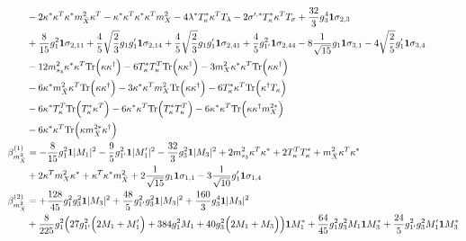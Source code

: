 {\begin{align}
 &-2 {\kappa^*  \kappa^{T}  \kappa^*  m_{\bar{X}}^2  \kappa^{T}} - {\kappa^*  \kappa^{T}  \kappa^*  \kappa^{T}  m_{X}^2} -4 \lambda^* {T_{\kappa}^*  \kappa^{T}} T_{\lambda} -2 \sigma^{\prime,*} {T_{\kappa}^*  \kappa^{T}} T_{\sigma} +\frac{32}{3} g_{3}^{4} {\bf 1} \sigma_{2,3} \nonumber \\ 
 &+\frac{8}{15} g_{1}^{2} {\bf 1} \sigma_{2,11} +\frac{4}{5} \sqrt{\frac{2}{3}} g_1 g_1' {\bf 1} \sigma_{2,14} +\frac{4}{5} \sqrt{\frac{2}{3}} g_1 g_1' {\bf 1} \sigma_{2,41} +\frac{4}{5} g_{1'}^{2} {\bf 1} \sigma_{2,44} -8 \frac{1}{\sqrt{15}} g_1 {\bf 1} \sigma_{3,1} -4 \sqrt{\frac{2}{5}} g_1' {\bf 1} \sigma_{3,4} \nonumber \\ 
 &-12 m_{s_3}^2 {\kappa^*  \kappa^{T}} \mbox{Tr}\Big({\kappa  \kappa^{\dagger}}\Big) -6 {T_{\kappa}^*  T_{\kappa}^{T}} \mbox{Tr}\Big({\kappa  \kappa^{\dagger}}\Big) -3 {m_{X}^2  \kappa^*  \kappa^{T}} \mbox{Tr}\Big({\kappa  \kappa^{\dagger}}\Big) \nonumber \\ 
 &-6 {\kappa^*  m_{\bar{X}}^2  \kappa^{T}} \mbox{Tr}\Big({\kappa  \kappa^{\dagger}}\Big) -3 {\kappa^*  \kappa^{T}  m_{X}^2} \mbox{Tr}\Big({\kappa  \kappa^{\dagger}}\Big) -6 {T_{\kappa}^*  \kappa^{T}} \mbox{Tr}\Big({\kappa^{\dagger}  T_{\kappa}}\Big) \nonumber \\ 
 &-6 {\kappa^*  T_{\kappa}^{T}} \mbox{Tr}\Big({T_{\kappa}^*  \kappa^{T}}\Big) -6 {\kappa^*  \kappa^{T}} \mbox{Tr}\Big({T_{\kappa}^*  T_{\kappa}^{T}}\Big) -6 {\kappa^*  \kappa^{T}} \mbox{Tr}\Big({\kappa  \kappa^{\dagger}  m_{X}^{2 *}}\Big) \nonumber \\ 
 &-6 {\kappa^*  \kappa^{T}} \mbox{Tr}\Big({\kappa  m_{\bar{X}}^{2 *}  \kappa^{\dagger}}\Big) \\ 
\beta_{m_{\bar{X}}^2}^{(1)} & =  
-\frac{8}{15} g_{1}^{2} {\bf 1} |M_1|^2 -\frac{9}{5} g_{1'}^{2} {\bf 1} |M_1'|^2 -\frac{32}{3} g_{3}^{2} {\bf 1} |M_3|^2 +2 m_{s_3}^2 {\kappa^{T}  \kappa^*} +2 {T_{\kappa}^{T}  T_{\kappa}^*} +{m_{\bar{X}}^2  \kappa^{T}  \kappa^*}\nonumber \\ 
 &+2 {\kappa^{T}  m_{X}^2  \kappa^*} +{\kappa^{T}  \kappa^*  m_{\bar{X}}^2}+2 \frac{1}{\sqrt{15}} g_1 {\bf 1} \sigma_{1,1} -3 \frac{1}{\sqrt{10}} g_1' {\bf 1} \sigma_{1,4} \\ 
\beta_{m_{\bar{X}}^2}^{(2)} & =  
+\frac{128}{45} g_{1}^{2} g_{3}^{2} {\bf 1} |M_3|^2 +\frac{48}{5} g_{1'}^{2} g_{3}^{2} {\bf 1} |M_3|^2 +\frac{160}{3} g_{3}^{4} {\bf 1} |M_3|^2 \nonumber \\ 
 &+\frac{8}{225} g_{1}^{2} \Big(27 g_{1'}^{2} \Big(2 M_1  + M_1'\Big) + 384 g_{1}^{2} M_1  + 40 g_{3}^{2} \Big(2 M_1  + M_3\Big)\Big){\bf 1} M_1^* +\frac{64}{45} g_{1}^{2} g_{3}^{2} M_1 {\bf 1} M_3^* +\frac{24}{5} g_{1'}^{2} g_{3}^{2} M_1' {\bf 1} M_3^* \nonumber \\ 

\end{align}}
